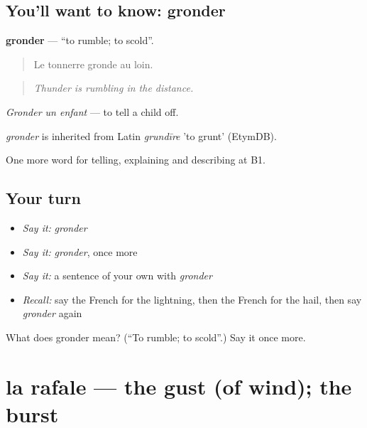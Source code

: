 \subsection*{You'll want to know: gronder}
\textbf{gronder} — \textquotedblleft{}to rumble; to scold\textquotedblright{}.

\begin{quote}
Le tonnerre gronde au loin.
\end{quote}

\begin{quote}
\emph{Thunder is rumbling in the distance.}
\end{quote}

\emph{Gronder un enfant} — to tell a child off.

\begin{cousinweb}
\emph{gronder} is inherited from Latin \emph{grundīre} 'to grunt' (EtymDB).
\end{cousinweb}

\begin{grammarlens}[title={What you've built}]
One more word for telling, explaining and describing at B1.
\end{grammarlens}

\subsection*{Your turn}
\begin{itemize}
\raggedright
  \item \emph{Say it:} \emph{gronder}
  \item \emph{Say it:} \emph{gronder}, once more
  \item \emph{Say it:} a sentence of your own with \emph{gronder}
  \item \emph{Recall:} say the French for the lightning, then the French for the hail, then say \emph{gronder} again
\end{itemize}

\begin{tcolorbox}[breakable,colback=teal!4,colframe=teal!35!black,title={Before you move on}]
What does gronder mean? (\textquotedblleft{}To rumble; to scold\textquotedblright{}.) Say it once more.
\end{tcolorbox}
\section[la rafale]{la rafale — the gust (of wind); the burst}

\label{lesson:FR-C462-rafale}



